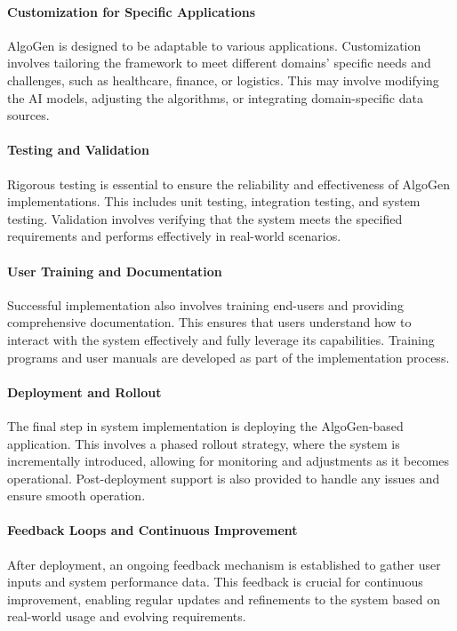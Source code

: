 \documentclass{article}
\begin{document}
\paragraph{Customization for Specific Applications}
AlgoGen is designed to be adaptable to various applications. Customization involves tailoring the framework to meet different domains' specific needs and challenges, such as healthcare, finance, or logistics. This may involve modifying the AI models, adjusting the algorithms, or integrating domain-specific data sources.

\paragraph{Testing and Validation}
Rigorous testing is essential to ensure the reliability and effectiveness of AlgoGen implementations. This includes unit testing, integration testing, and system testing. Validation involves verifying that the system meets the specified requirements and performs effectively in real-world scenarios.

\paragraph{User Training and Documentation}
Successful implementation also involves training end-users and providing comprehensive documentation. This ensures that users understand how to interact with the system effectively and fully leverage its capabilities. Training programs and user manuals are developed as part of the implementation process.

\paragraph{Deployment and Rollout}
The final step in system implementation is deploying the AlgoGen-based application. This involves a phased rollout strategy, where the system is incrementally introduced, allowing for monitoring and adjustments as it becomes operational. Post-deployment support is also provided to handle any issues and ensure smooth operation.

\paragraph{Feedback Loops and Continuous Improvement}
After deployment, an ongoing feedback mechanism is established to gather user inputs and system performance data. This feedback is crucial for continuous improvement, enabling regular updates and refinements to the system based on real-world usage and evolving requirements.
\end{document}
